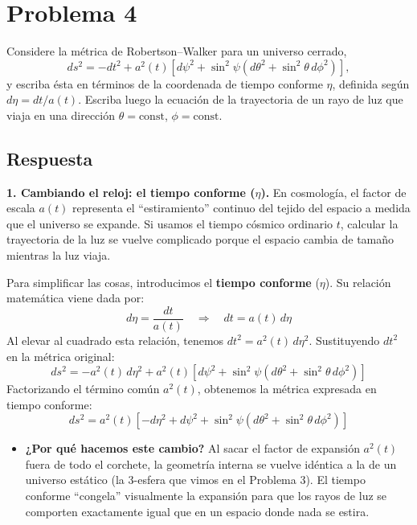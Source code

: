 \documentclass[11pt,a4paper]{article}
\begin{document}
\section*{Problema 4}
Considere la métrica de Robertson--Walker para un universo cerrado,
\begin{equation}
  ds^2=-dt^2+a^2(t)\left[d\psi^2+\sin^2\psi\left(d\theta^2+\sin^2\theta\,d\phi^2\right)\right],
\end{equation}
y escriba ésta en términos de la coordenada de tiempo conforme $\eta$, definida según $d\eta=dt/a(t)$. Escriba luego la ecuación de la trayectoria de un rayo de luz que viaja en una dirección $\theta=\text{const}$, $\phi=\text{const}$.

\subsection*{Respuesta}

\noindent\textbf{1. Cambiando el reloj: el tiempo conforme ($\eta$).} En cosmología, el factor de escala $a(t)$ representa el ``estiramiento'' continuo del tejido del espacio a medida que el universo se expande. Si usamos el tiempo cósmico ordinario $t$, calcular la trayectoria de la luz se vuelve complicado porque el espacio cambia de tamaño mientras la luz viaja.

Para simplificar las cosas, introducimos el \textbf{tiempo conforme} ($\eta$). Su relación matemática viene dada por:
\[
d\eta = \frac{dt}{a(t)} \quad\Longrightarrow\quad dt = a(t)\,d\eta
\]
Al elevar al cuadrado esta relación, tenemos $dt^2 = a^2(t)\,d\eta^2$. Sustituyendo $dt^2$ en la métrica original:
\[
ds^2 = -a^2(t)\,d\eta^2 + a^2(t)\left[d\psi^2 + \sin^2\psi\left(d\theta^2 + \sin^2\theta\,d\phi^2\right)\right]
\]
Factorizando el término común $a^2(t)$, obtenemos la métrica expresada en tiempo conforme:
\[
ds^2 = a^2(t)\left[ -d\eta^2 + d\psi^2 + \sin^2\psi\left(d\theta^2 + \sin^2\theta\,d\phi^2\right) \right]
\]
\begin{itemize}
  \item \textbf{¿Por qué hacemos este cambio?} Al sacar el factor de expansión $a^2(t)$ fuera de todo el corchete, la geometría interna se vuelve idéntica a la de un universo estático (la 3-esfera que vimos en el Problema 3). El tiempo conforme ``congela'' visualmente la expansión para que los rayos de luz se comporten exactamente igual que en un espacio donde nada se estira.
\end{itemize}
\end{document}
